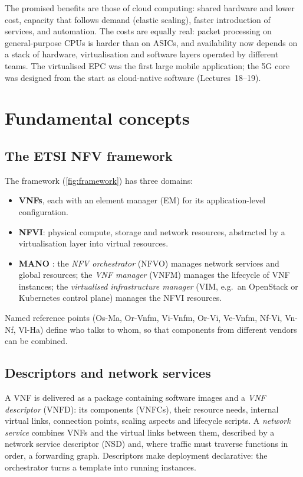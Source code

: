 \documentclass[11pt,a4paper]{article}
\begin{document}
The promised benefits are those of cloud computing: shared hardware and lower cost, capacity that follows
demand (elastic scaling), faster introduction of services, and automation. The costs are equally real:
packet processing on general-purpose CPUs is harder than on ASICs, and availability now depends on a stack
of hardware, virtualisation and software layers operated by different teams. The virtualised EPC was the
first large mobile application; the 5G core was designed from the start as cloud-native software
(Lectures~18--19).

\section{Fundamental concepts}

\subsection{The ETSI NFV framework}
The framework (\cref{fig:framework}) \cite{etsinfv002} has three domains:
\begin{itemize}
  \item \textbf{VNFs}, each with an element manager (EM) for its application-level configuration.
  \item \textbf{NFVI}: physical compute, storage and network resources, abstracted by a virtualisation layer
        into virtual resources.
  \item \textbf{MANO} \cite{etsinfvman001}: the \emph{NFV orchestrator} (NFVO) manages network services and
        global resources; the \emph{VNF manager} (VNFM) manages the lifecycle of VNF instances; the
        \emph{virtualised infrastructure manager} (VIM, e.g.\ an OpenStack or Kubernetes control plane)
        manages the NFVI resources.
\end{itemize}
Named reference points (Os-Ma, Or-Vnfm, Vi-Vnfm, Or-Vi, Ve-Vnfm, Nf-Vi, Vn-Nf, Vl-Ha) define who talks to whom,
so that components from different vendors can be combined.

\begin{acnfigure}
  \caption{ETSI NFV architectural framework with its main reference points \cite{etsinfv002}.}
  \label{fig:framework}
\end{acnfigure}

\subsection{Descriptors and network services}
A VNF is delivered as a package containing software images and a \emph{VNF descriptor} (VNFD): its components
(VNFCs), their resource needs, internal virtual links, connection points, scaling aspects and lifecycle
scripts. A \emph{network service} combines VNFs and the virtual links between them, described by a network
service descriptor (NSD) and, where traffic must traverse functions in order, a forwarding graph. Descriptors
make deployment declarative: the orchestrator turns a template into running instances.
\end{document}
